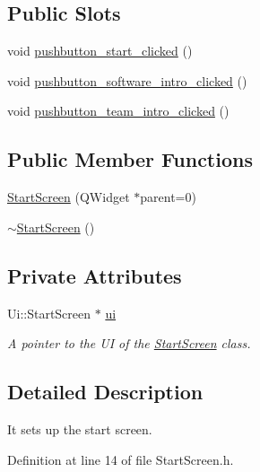 \subsection*{Public Slots}
\begin{DoxyCompactItemize}
\item 
void \hyperlink{class_start_screen_a8343a5d292a0361ae1a760ff109f5740}{pushbutton\+\_\+start\+\_\+clicked} ()
\item 
void \hyperlink{class_start_screen_a46f7199921ac073d0601ba4ca92659c7}{pushbutton\+\_\+software\+\_\+intro\+\_\+clicked} ()
\item 
void \hyperlink{class_start_screen_a5b2dcf2fc1bf0bae99674a1d2f7c4771}{pushbutton\+\_\+team\+\_\+intro\+\_\+clicked} ()
\end{DoxyCompactItemize}
\subsection*{Public Member Functions}
\begin{DoxyCompactItemize}
\item 
\hyperlink{class_start_screen_a635b9676e997e79c0a5bbecc6f2103eb}{Start\+Screen} (Q\+Widget $\ast$parent=0)
\item 
\hyperlink{class_start_screen_afb1b54b9d5cda32ea7e9e1c5cf8b9300}{$\sim$\+Start\+Screen} ()
\end{DoxyCompactItemize}
\subsection*{Private Attributes}
\begin{DoxyCompactItemize}
\item 
Ui\+::\+Start\+Screen $\ast$ \hyperlink{class_start_screen_a2213dadd46a5ff18a6b9ef1063077ef0}{ui}
\begin{DoxyCompactList}\small\item\em A pointer to the UI of the \hyperlink{class_start_screen}{Start\+Screen} class. \end{DoxyCompactList}\end{DoxyCompactItemize}


\subsection{Detailed Description}
It sets up the start screen. 

Definition at line 14 of file Start\+Screen.\+h.



